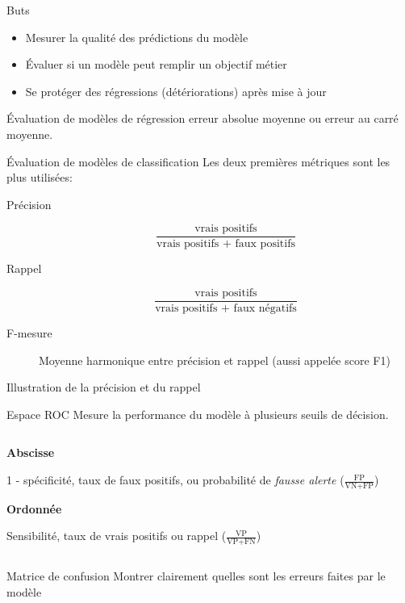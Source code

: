 \begin{frame}{Buts}
  \begin{itemize}[<+->]
    \item Mesurer la qualité des prédictions du modèle
    \item Évaluer si un modèle peut remplir un objectif métier
    \item Se protéger des régressions (détériorations) après mise à jour
  \end{itemize}
\end{frame}

\begin{frame}{Évaluation de modèles de régression}
  erreur absolue moyenne ou erreur au carré moyenne.
\end{frame}

\begin{frame}{Évaluation de modèles de classification}
  Les deux premières métriques sont les plus utilisées:
  \begin{description}
  \item[Précision]
    \[
    \frac{\text{vrais positifs}}{\text{vrais positifs + faux positifs}}
    \]
  \item[Rappel]
    \[
    \frac{\text{vrais positifs}}{\text{vrais positifs + faux négatifs}}
  \]
  \item[F-mesure] Moyenne harmonique entre précision et rappel (aussi appelée score F1)
  \end{description}
\end{frame}

\begin{frame}{Illustration de la précision et du rappel}
\end{frame}

\begin{frame}{Espace ROC}
  Mesure la performance du modèle à plusieurs seuils de décision.
  \begin{columns}
    \begin{column}{.48\textwidth}
      \textbf{Abscisse}

      1 - spécificité, taux de faux positifs, ou probabilité de \emph{fausse alerte} ($\frac{\text{FP}}{\text{VN} + \text{FP}}$)
 
      \vspace{1cm}
      \textbf{Ordonnée}
  
      Sensibilité, taux de vrais positifs ou rappel ($\frac{\text{VP}}{\text{VP} + \text{FN}}$)
    \end{column}
    \begin{column}{.52\textwidth}
    \end{column}
  \end{columns}
\end{frame}

\begin{frame}{Matrice de confusion}
  Montrer clairement quelles sont les erreurs faites par le modèle
\end{frame}
